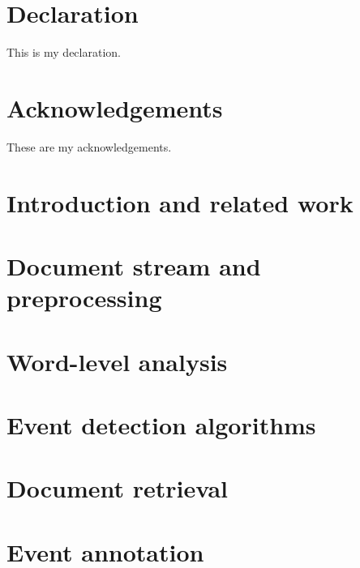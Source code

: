 \documentclass[12pt,twoside]{report}
\begin{document}






\chapter*{Declaration}
This is my declaration.


\chapter*{Acknowledgements}
These are my acknowledgements.


\tableofcontents

\chapter{Introduction and related work}


\chapter{Document stream and preprocessing}
\label{chap:data-preprocessing}


\chapter{Word-level analysis}
\label{chap:word-analysis}


\chapter{Event detection algorithms}
\label{chap:event-detection}


\chapter{Document retrieval}
\label{chap:document-retrieval}


\chapter{Event annotation}
\label{chap:event-annotation}

\end{document}
